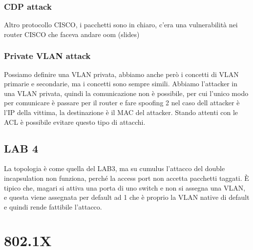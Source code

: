 \documentclass[12pt, oneside]{extbook} %
\begin{document}
\subsection{CDP attack}
Altro protocollo CISCO, i pacchetti sono in chiaro, c'era una vulnerabilità nei router CISCO che faceva andare oom (slides)
\subsection{Private VLAN attack}
Possiamo definire una VLAN privata, abbiamo anche però i concetti di VLAN primarie e secondarie, ma i concetti sono sempre simili. Abbiamo l'attacker in una VLAN privata, quindi la comunicazione non è possibile, per cui l'unico modo per comunicare è passare per il router e fare spoofing
2 nel caso dell attacker è l'IP della vittima, la destinazione è il MAC del attacker. Stando attenti con le ACL è possibile evitare questo tipo di attacchi.
\section*{LAB 4}
La topologia è come quella del LAB3, ma su cumulus l'attacco del double incapsulation non funziona, perché la access port non accetta pacchetti taggati. È tipico che, magari si attiva una porta di uno switch e non si assegna una VLAN, e questa viene assegnata per default ad 1 che è proprio la VLAN native di default e quindi rende fattibile l'attacco.
\chapter{802.1X}
\end{document}

